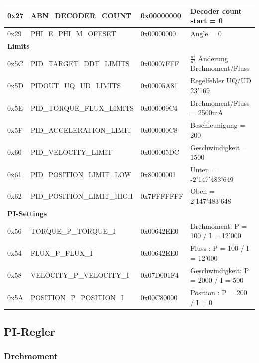 \begin{table}[H]
\begin{tabularx}{\linewidth}{|l|l|l|X|}
0x27         & ABN\_DECODER\_COUNT           & 0x00000000 & Decoder count start = 0 \\ \hline
0x29         & PHI\_E\_PHI\_M\_OFFSET  & 0x00000000 & Angle = 0    \\ \hline
\multicolumn{4}{|l|}{\textbf{Limits}}                         \\ \hline
0x5C         & PID\_TARGET\_DDT\_LIMITS & 0x00007FFF & $\frac{di}{dt}$ Änderung Drehmoment/Fluss   \\ \hline
0x5D         & PIDOUT\_UQ\_UD\_LIMITS         & 0x00005A81 &    Regelfehler UQ/UD 23'169\\ \hline
0x5E         & PID\_TORQUE\_FLUX\_LIMITS      & 0x000009C4 &    Drehmoment/Fluss = 2500mA\\ \hline
0x5F         & PID\_ACCELERATION\_LIMIT      & 0x000000C8 & Beschleunigung = 200     \\ \hline
0x60         & PID\_VELOCITY\_LIMIT          & 0x000005DC & Geschwindigkeit = 1500    \\ \hline
0x61         & PID\_POSITION\_LIMIT\_LOW & 0x80000001 &    Unten = -2'147'483'649 \\ \hline
0x62         & PID\_POSITION\_LIMIT\_HIGH     & 0x7FFFFFFF & Oben  = 2'147'483'648  \\ \hline
\multicolumn{4}{|l|}{\textbf{PI-Settings}}       \\ \hline
0x56         & TORQUE\_P\_TORQUE\_I    & 0x00642EE0 &  Drehmoment: P = 100 / I = 12'000   \\ \hline
0x54         & FLUX\_P\_FLUX\_I  & 0x00642EE0 &  Fluss : P = 100 / I = 12'000   \\ \hline
0x58         & VELOCITY\_P\_VELOCITY\_I  & 0x07D001F4 & Geschwindigkeit: P = 2000 / I = 500    \\ \hline
0x5A         & POSITION\_P\_POSITION\_I  & 0x00C80000 & Position : P = 200 / I = 0    \\ \hline
\end{tabularx}
\end{table}

\subsection{PI-Regler}

\subsubsection{Drehmoment}\label{Appendix:PI_Torque}

